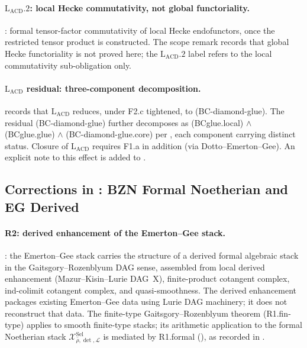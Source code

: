 \paragraph{\(\mathrm{L}_{\mathrm{ACD}}.2\): local Hecke commutativity, not global functoriality.}
 \ClaimStatusProvedHere: formal
tensor-factor commutativity of local Hecke endofunctors, once the
restricted tensor product is constructed. The scope remark
 records that global Hecke
functoriality is not proved here; the
\(\mathrm{L}_{\mathrm{ACD}}.2\) label refers to the local
commutativity sub-obligation only.

\paragraph{\(\mathrm{L}_{\mathrm{ACD}}\) residual: three-component decomposition.}
 records that
\(\mathrm{L}_{\mathrm{ACD}}\) reduces, under F2.c tightened, to
(BC-diamond-glue). The residual (BC-diamond-glue) further decomposes
as (BCglue.local) \(\wedge\) (BCglue.glue) \(\wedge\)
(BC-diamond-glue.core) per ,
each component carrying distinct status. Closure of
\(\mathrm{L}_{\mathrm{ACD}}\) requires F1.a in addition
(\ClaimStatusNeedsVerification via Dotto--Emerton--Gee).
An explicit note to this effect is added to
.

\subsection{Corrections in : BZN Formal Noetherian and EG Derived}
\label{v4-arith:w3-audit-A:ch32}

\paragraph{R2: derived enhancement of the Emerton--Gee stack.}
 \ClaimStatusProvedHere: the
Emerton--Gee stack carries the structure of a derived formal algebraic
stack in the Gaitsgory--Rozenblyum DAG sense, assembled from local
derived enhancement (Mazur--Kisin--Lurie DAG~X), finite-product
cotangent complex, ind-colimit cotangent complex, and quasi-smoothness.
The derived enhancement packages existing Emerton--Gee data using
Lurie DAG machinery; it does not reconstruct that data. The
finite-type Gaitsgory--Rozenblyum theorem (R1.fin-type) applies to
smooth finite-type stacks; its arithmetic application to the formal
Noetherian stack
\(\mathcal{X}^{\mathrm{Sel}}_{\bar\rho,\det,\mathcal{L}}\) is
mediated by R1.formal (\ClaimStatusConjectured), as recorded in
.

